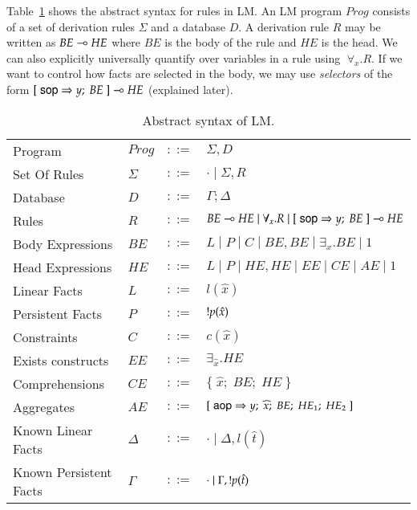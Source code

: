 
\newcommand{\selector}[0]{[\; \m{sop} \Rightarrow y; \; BE \;] \lolli HE}
\newcommand{\comprehension}[0]{\{ \; \widehat{x}; \; BE; \; HE \; \}}
\newcommand{\aggregate}[0]{[\;\m{aop} \Rightarrow y; \; \widehat{x}; \; BE; \; HE_1; \; HE_2 \;]}

Table~\ref{tbl:ast} shows the abstract syntax for rules in LM.
An LM program $Prog$ consists of a set of derivation rules $\Sigma$ and a database $D$.
A derivation rule $R$ may be written as $BE \multimap HE$ where $BE$ is the body of the rule and
$HE$ is the head.
We can also explicitly universally quantify over variables in a rule using $\; \forall_{x}. R$.
If we want to control how facts are selected in the body, we may use \emph{selectors} of
the form $\selector$ (explained later).

\begin{table}[h]
\centering
\begin{tabular}{ l l c l }
  Program & $Prog$ & $::=$ & $\Sigma, D$ \\
  Set Of Rules & $\Sigma$ & $::=$ & $\cdot \; | \; \Sigma, R$\\
  Database & $D$ & $::=$ & $\Gamma; \Delta$ \\
  Rules & $R$ & $::=$ & $BE \lolli HE \; | \; \forall_{x}. R \; | \; \selector$ \\
  Body Expressions & $BE$ & $::=$ & $L \; | \; P \; | \; C \; | \; BE, BE \; | \; \exists_{x}. BE \; | \; 1$\\
  Head Expressions & $HE$ & $::=$ & $L \; | \; P \; | \; HE, HE \; | \; EE \; | \; CE \; | \; AE \; | \; 1$\\
  
  Linear Facts & $L$ & $::=$ & $l(\hat{x})$\\
  Persistent Facts & $P$ & $::=$ & ${!} p(\hat{x})$\\
  Constraints & $C$ & $::=$ & $c(\hat{x})$ \\
  
  Exists constructs & $EE$ & $::=$ & $\exists_{\widehat{x}}. HE$ \\
  Comprehensions & $CE$ & $::=$ & $\comprehension$ \\
  Aggregates & $AE$ & $::=$ & $\aggregate$ \\
  
  Known Linear Facts & $\Delta$ & $::=$ & $\cdot \; | \; \Delta, l(\hat{t})$ \\
  Known Persistent Facts & $\Gamma$ & $::=$ & $\cdot \; | \; \Gamma, {!} p(\hat{t})$ \\
\end{tabular}
\caption{Abstract syntax of LM.}\label{tbl:ast}
\end{table}

